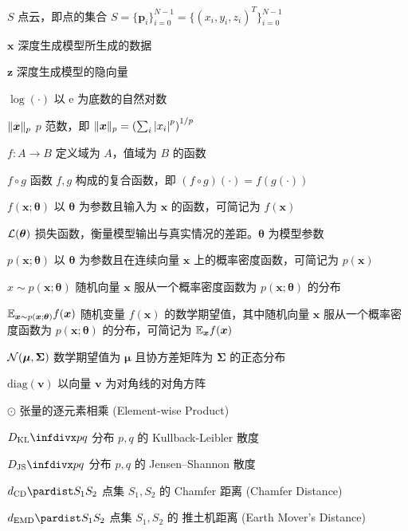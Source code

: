 \begin{denotation}[2.8cm]
	\item[$S$]        点云，即点的集合 $S = \{\bm p_i\}_{i=0}^{N - 1}
		= \{(x_i, y_i, z_i)^T\}_{i=0}^{N - 1}$

	\item[$\bm x$]    深度生成模型所生成的数据
	\item[$\bm z$]    深度生成模型的隐向量


	\item[$\log(\cdot)$] 以 $\mathrm{e}$ 为底数的自然对数
	\item[$\lVert\bm x\rVert_p$] $p$ 范数，即
	$\lVert\bm x\rVert_p ={\left( \sum_{i} \left| x_i \right|^p \right)}^{1/p}$

	\item[$f: A \to B$]          定义域为 $A$，值域为 $B$ 的函数
	\item[$f \circ g$]           函数 $f, g$ 构成的复合函数，即 $(f \circ g)(\cdot) = f(g(\cdot))$

	\item[$f(\bm x; \bm\theta)$] 以 $\bm\theta$ 为参数且输入为 $\bm x$ 的函数，可简记为 $f(\bm x)$
	\item[$\mathcal{L}(\bm\theta)$] 损失函数，衡量模型输出与真实情况的差距。$\bm\theta$ 为模型参数

	\item[$p(\bm x; \bm\theta)$] 以 $\bm\theta$ 为参数且在连续向量 $\bm x$ 上的概率密度函数，可简记为 $p(\bm x)$
	\item[$x \sim p(\bm x; \bm\theta)$] 随机向量 $\bm x$ 服从一个概率密度函数为 $p(\bm x; \bm\theta)$ 的分布
	\item[$\mathbb{E}_{\bm x \sim p(\bm x; \bm\theta)} {f(\bm x)}$] 随机变量 $f(\bm x)$ 的数学期望值，其中随机向量 $\bm x$ 服从一个概率密度函数为  $p(\bm x; \bm\theta)$ 的分布，可简记为 $\mathbb{E}_{\bm x} {f(\bm x)}$
	\item[$\mathcal{N}(\bm\mu,\bm\Sigma)$] 数学期望值为 $\bm\mu$ 且协方差矩阵为 $\bm\Sigma$ 的正态分布
	\item[$\mathrm{diag}(\bm v)$] 以向量 $\bm v$ 为对角线的对角方阵
	\item[$\odot$] 张量的逐元素相乘 (Element-wise Product)

	\item[$\DKL{p}{q}$] 分布 $p, q$ 的 Kullback-Leibler 散度
	\item[$\DJS{p}{q}$] 分布 $p, q$ 的 Jensen–Shannon 散度

	\item[$\DCD{S_1}{S_2}$]  点集 $S_1, S_2$ 的 Chamfer 距离 (Chamfer Distance)
	\item[$\DEMD{S_1}{S_2}$] 点集 $S_1, S_2$ 的 推土机距离 (Earth Mover's Distance)
\end{denotation}
